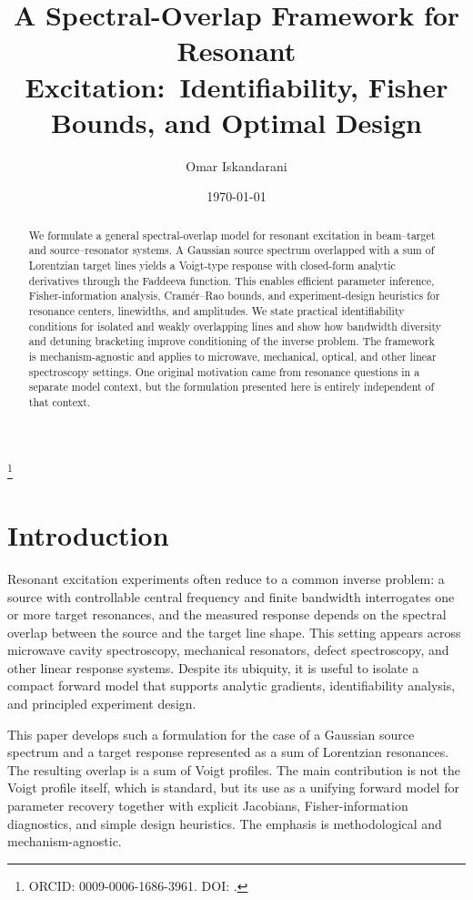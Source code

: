 \documentclass[aps,pre,amsmath,amssymb]{revtex4-2}
\begin{document}
\title{A Spectral-Overlap Framework for Resonant Excitation:\ Identifiability, Fisher Bounds, and Optimal Design}

\author{Omar Iskandarani}
\thanks{ORCID: 0009-0006-1686-3961. DOI: \paperdoi.}

\date{\today}

\begin{abstract}
We formulate a general spectral-overlap model for resonant excitation in beam--target and source--resonator systems. A Gaussian source spectrum overlapped with a sum of Lorentzian target lines yields a Voigt-type response with closed-form analytic derivatives through the Faddeeva function. This enables efficient parameter inference, Fisher-information analysis, Cram\'er--Rao bounds, and experiment-design heuristics for resonance centers, linewidths, and amplitudes. We state practical identifiability conditions for isolated and weakly overlapping lines and show how bandwidth diversity and detuning bracketing improve conditioning of the inverse problem. The framework is mechanism-agnostic and applies to microwave, mechanical, optical, and other linear spectroscopy settings. One original motivation came from resonance questions in a separate model context, but the formulation presented here is entirely independent of that context.
\end{abstract}

\maketitle

\section{Introduction}
Resonant excitation experiments often reduce to a common inverse problem: a source with controllable central frequency and finite bandwidth interrogates one or more target resonances, and the measured response depends on the spectral overlap between the source and the target line shape. This setting appears across microwave cavity spectroscopy, mechanical resonators, defect spectroscopy, and other linear response systems. Despite its ubiquity, it is useful to isolate a compact forward model that supports analytic gradients, identifiability analysis, and principled experiment design.

This paper develops such a formulation for the case of a Gaussian source spectrum and a target response represented as a sum of Lorentzian resonances. The resulting overlap is a sum of Voigt profiles. The main contribution is not the Voigt profile itself, which is standard, but its use as a unifying forward model for parameter recovery together with explicit Jacobians, Fisher-information diagnostics, and simple design heuristics. The emphasis is methodological and mechanism-agnostic.
\end{document}

